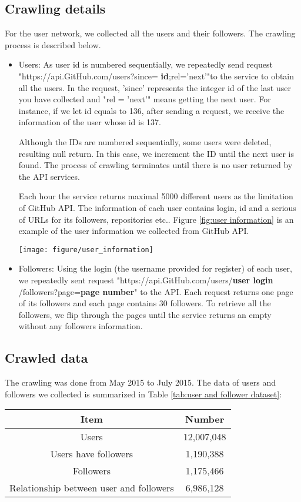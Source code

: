 \documentclass[12pt,oneside,final]{vlsithesis}
\begin{document}
\subsection{Crawling details}
For the user network, we collected all the users and their followers. The crawling process is described below.
\begin{itemize}
	\item Users: As user id is numbered sequentially\cite{2}, we repeatedly send request  "https://api.GitHub.com/users?since= \textbf{id};rel='next'"to the service to obtain all the users. In the request, 'since' represents the integer id of the last user you have collected and "rel = 'next'" means getting the next user. For instance, if we let id equals to 136, after sending a request, we receive the information of the user whose id is 137. 
	
Although the IDs are numbered sequentially, some users were deleted, resulting null return. In this case,  we increment the ID until the next user is found. The process of crawling terminates until there is no user returned by the API services. 

Each hour the service returns maximal 5000 different users as the limitation of GitHub API. The information of each user contains login,  id and a serious of URLs for its followers, repositories etc.. Figure \ref{fig:user information} is an example of the user information we collected from GitHub API.
	\begin{figure*}
		\centering
		\texttt{[image: figure/user\_information]}
		\caption{Example of user information}
		\label{fig:user information}
	\end{figure*}  
	\item Followers: Using the login (the username provided for register) of each user,  we repeatedly sent request  "https://api.GitHub.com/users/\textbf{user login} /followers?page=\textbf{page number}" to the API. Each request returns one page of its followers and each page contains 30 followers. To retrieve all the followers, we flip through the pages until the service returns an empty without any followers information. 
\end{itemize}

\subsection{Crawled data}
The crawling was done from May 2015 to July 2015. The data of users and followers we collected is summarized in Table \ref{tab:user and follower dataset}:
\begin{table*}[h]
	\centering
	\begin{tabular}{c|c} \toprule
		Item & Number \\ \hline
		Users & 12,007,048 \\ 
		Users have followers & 1,190,388 \\ 
		Followers & 1,175,466 \\ 
		Relationship between user and followers & 6,986,128 \\ \bottomrule
	\end{tabular}
	\caption{User and follower dataset}
	\label{tab:user and follower dataset}
\end{table*}
\end{document}
